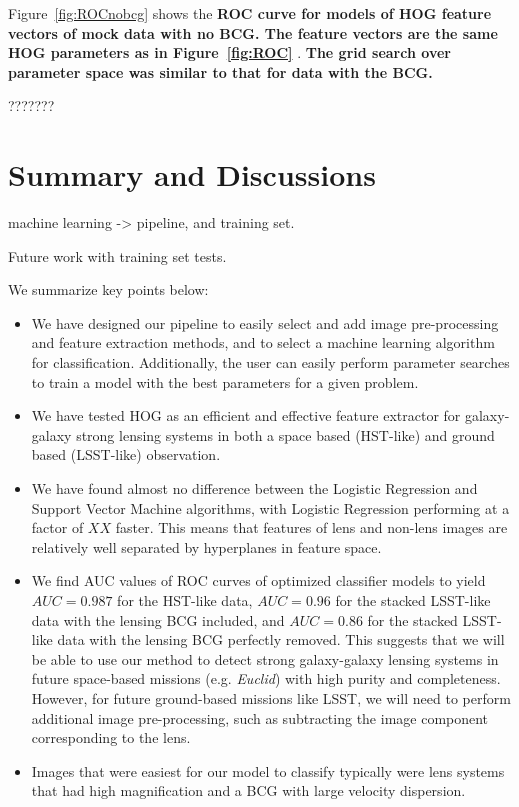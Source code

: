 \documentclass{emulateapj}
\newcommand{\todo}[1]{{\bf\color{blue} #1}}
\begin{document}
Figure~\ref{fig:ROCnobcg} shows the \todo{ROC curve for models of HOG
  feature vectors of mock data with no BCG.  The feature vectors are
  the same HOG parameters as in Figure~\ref{fig:ROC} }.  \todo{The
  grid search over parameter space was similar to that for data with
  the BCG.}

???????

\section{Summary and Discussions}
\label{sec:conclusions}

machine learning -> pipeline, and training set.  

Future work with training set tests.


We summarize key points below:

\begin{itemize}

\item We have designed our pipeline to easily select and add image
  pre-processing and feature extraction methods, and to select a
  machine learning algorithm for classification.  Additionally, the
  user can easily perform parameter searches to train a model with the
  best parameters for a given problem.

\item We have tested HOG as an efficient and effective feature
  extractor for galaxy-galaxy strong lensing systems in both a space
  based (HST-like) and ground based (LSST-like) observation.  

\item We have found almost no difference between the Logistic
  Regression and Support Vector Machine algorithms, with Logistic
  Regression performing at a factor of $XX$ faster.  This means that
  features of lens and non-lens images are relatively well separated
  by hyperplanes in feature space.

\item We find AUC values of ROC curves of optimized classifier models
  to yield $AUC=0.987$ for the HST-like data, $AUC=0.96$ for the
  stacked LSST-like data with the lensing BCG included, and $AUC=0.86$
  for the stacked LSST-like data with the lensing BCG perfectly
  removed.  This suggests that we will be able to use our method to
  detect strong galaxy-galaxy lensing systems in future space-based
  missions (e.g. {\em Euclid}) with high purity and completeness.
  However, for future ground-based missions like LSST, we will need to
  perform additional image pre-processing, such as subtracting the
  image component corresponding to the lens.

\item Images that were easiest for our model to classify typically
  were lens systems that had high magnification and a BCG with large
  velocity dispersion.  

\end{itemize}
\end{document}
